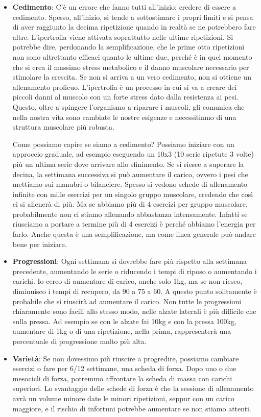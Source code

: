 \documentclass[12pt]{book} %
\begin{document}
\begin{itemize}
\item \textbf{Cedimento}:
C'è un errore che fanno tutti all'inizio: credere di essere a cedimento.
Spesso, all'inizio, si tende a sottostimare i propri limiti e si pensa di aver raggiunto la decima ripetizione quando in realtà se ne potrebbero fare altre.
L'ipertrofia viene attivata soprattutto nelle ultime ripetizioni. Si potrebbe dire, perdonando la semplificazione, che le prime otto ripetizioni non sono altrettanto efficaci quanto le ultime due, perché è in quel momento che si crea il massimo stress metabolico e il danno muscolare necessario per stimolare la crescita. Se non si arriva a un vero cedimento, non si ottiene un allenamento proficuo.
L'ipertrofia è un processo in cui si va a creare dei piccoli danni al muscolo con un forte stress dato dalla resistenza ai pesi. Questo, oltre a spingere l'organismo a riparare i muscoli, gli comunica che nella nostra vita sono cambiate le nostre esigenze e necessitiamo di una struttura muscolare più robusta.

Come possiamo capire se siamo a cedimento?
Possiamo iniziare con un approccio graduale, ad esempio eseguendo un 10x3 (10 serie ripetute 3 volte) più un ultima serie dove arrivare allo sfinimento. Se si riesce a superare la decina, la settimana successiva si può aumentare il carico, ovvero i pesi che mettiamo sui manubri o bilanciere.
Spesso si vedono schede di allenamento infinite con mille esercizi per un singolo gruppo muscolare, credendo che così ci si allenerà di più. Ma se abbiamo più di 4 esercizi per gruppo muscolare, probabilmente non ci stiamo allenando abbastanza intensamente. Infatti se riusciamo a portare a termine più di 4 esercizi è perché abbiamo l'energia per farlo. Anche questa è una semplificazione, ma come linea generale può andare bene per iniziare.

\item \textbf{Progressioni}:
Ogni settimana si dovrebbe fare più rispetto alla settimana precedente, aumentando le serie o riducendo i tempi di riposo o aumentando i carichi.
Io cerco di aumentare di carico, anche solo 1kg, ma se non riesco, diminuisco i tempi di recupero, da 90 a 75 a 60. A questo punto solitamente è probabile che si riuscirà ad aumentare il carico.
Non tutte le progressioni chiaramente sono facili allo stesso modo, nelle alzate laterali è più difficile che sulla pressa. Ad esempio se con le alzate fai 10kg e con la pressa 100kg, aumentare di 1kg o di una ripetizione, nella prima, rappresenterà una percentuale di progressione molto più alta.

\item \textbf{Varietà}:
Se non dovessimo più riuscire a progredire, possiamo cambiare esercizi o fare per 6/12 settimane, una scheda di forza. Dopo uno o due mesocicli di forza, potremmo affrontare la scheda di massa con carichi superiori. Lo svantaggio delle schede di forza è che la sessione di allenamento avrà un volume minore date le minori ripetizioni, seppur con un carico maggiore, e il rischio di infortuni potrebbe aumentare se non stiamo attenti.
\end{itemize}
\end{document}
